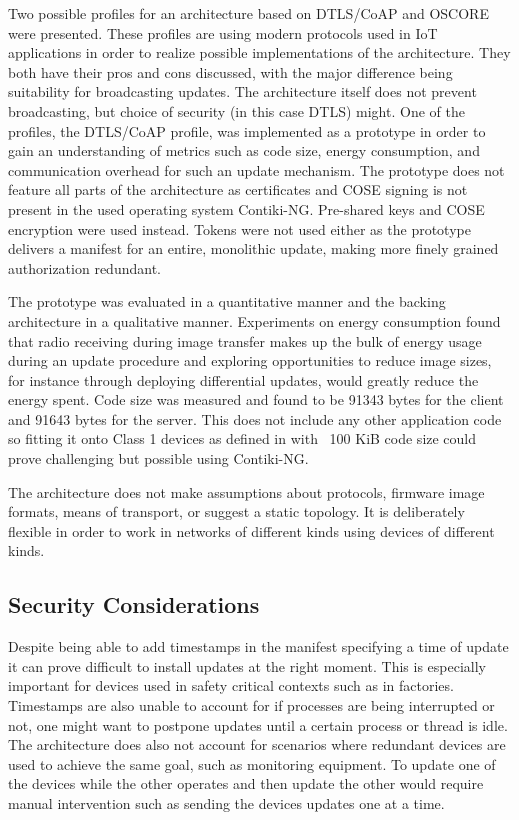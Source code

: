 \documentclass[0-thesis.tex]{subfiles}
\begin{document}
Two possible profiles for an architecture based on DTLS/CoAP and OSCORE were presented.
These profiles are using modern protocols used in IoT applications in order to realize
possible implementations of the architecture. They both have their pros and cons
discussed, with the major difference being suitability for broadcasting updates. The
architecture itself does not prevent broadcasting, but choice of security (in this case
DTLS) might. One of the profiles, the DTLS/CoAP profile, was implemented as a prototype in
order to gain an understanding of metrics such as code size, energy consumption, and
communication overhead for such an update mechanism. The prototype does not feature all
parts of the architecture as certificates and COSE signing is not present in the used
operating system Contiki-NG. Pre-shared keys and COSE encryption were used instead. Tokens
were not used either as the prototype delivers a manifest for an entire, monolithic
update, making more finely grained authorization redundant.


The prototype was evaluated in a quantitative manner and the backing architecture in a
qualitative manner. Experiments on energy consumption found that radio receiving during
image transfer makes up the bulk of energy usage during an update procedure and exploring
opportunities to reduce image sizes, for instance through deploying differential updates,
would greatly reduce the energy spent. Code size was measured and found to be 91343 bytes
for the client and 91643 bytes for the server. This does not include any other application
code so fitting it onto Class 1 devices as defined in \parencite{rfc7228} with ~100 KiB
code size could prove challenging but possible using Contiki-NG. 

The architecture does not make assumptions about protocols, firmware image formats, means
of transport, or suggest a static topology. It is deliberately flexible in order to work in
networks of different kinds using devices of different kinds.

\subsection{Security Considerations}
\label{ssec:security-considerations}
Despite being able to add timestamps in the manifest specifying a time of update it can
prove difficult to install updates at the right moment. This is especially important for
devices used in safety critical contexts such as in factories. Timestamps are also unable
to account for if processes are being interrupted or not, one might want to postpone
updates until a certain process or thread is idle. The architecture does also not account
for scenarios where redundant devices are used to achieve the same goal, such as
monitoring equipment. To update one of the devices while the other operates and then
update the other would require manual intervention such as sending the devices updates one
at a time.
\end{document}
